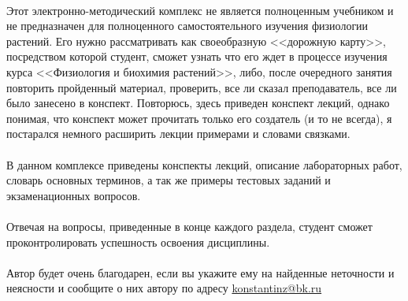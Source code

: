 \paragraph*{}Этот электронно-методический комплекс не является полноценным учебником и не предназначен для полноценного самостоятельного изучения физиологии растений. Его нужно рассматривать как своеобразную <<дорожную карту>>, посредством которой студент, сможет узнать что его ждет в процессе изучения курса <<Физиология и биохимия растений>>, либо, после очередного занятия повторить пройденный материал, проверить, все ли сказал преподаватель, все ли было занесено в конспект. Повторюсь, здесь приведен конспект лекций, однако понимая, что конспект может прочитать только его создатель (и то не всегда), я постарался немного расширить лекции примерами и словами связками.

\paragraph*{}В данном комплексе приведены конспекты лекций, описание лабораторных работ, словарь основных терминов, а так же примеры тестовых заданий и экзаменационных вопросов.

\paragraph*{}Отвечая на вопросы, приведенные в конце каждого раздела, студент сможет проконтролировать успешность освоения дисциплины.

\paragraph*{}

\paragraph*{}

\paragraph*{}Автор будет очень благодарен, если вы укажите ему на найденные неточности и неясности и сообщите о них автору по адресу \href{mailto:konstantinz@bk.ru}{konstantinz@bk.ru}
